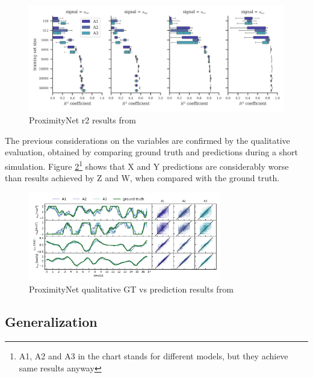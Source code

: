 \begin{figure}[!htb]
	\centering
	\includegraphics[width=1\textwidth]{"contents/images/03-proximitynet-r2"}
	\caption[ProximityNet \gls{r2} results from \cite{mantegazza2019visionbased}]{ProximityNet \gls{r2} results from \cite{mantegazza2019visionbased}}
	\label{fig:proximitynet-r2}
\end{figure}

\medskip

The previous considerations on the variables are confirmed by the qualitative evaluation, obtained by comparing ground truth and predictions during a short simulation. Figure \ref{fig:proximitynet-gt-pred}\footnote{A1, A2 and A3 in the chart stands for different models, but they achieve same results anyway} shows that X and Y predictions are considerably worse than results achieved by Z and W, when compared with the ground truth.

\begin{figure}[!htb]
	\centering
	\includegraphics[width=0.75\textwidth]{"contents/images/03-proximitynet-gt-pred"}
	\caption[ProximityNet qualitative GT vs prediction results from \cite{mantegazza2019visionbased}]{ProximityNet qualitative GT vs prediction results from \cite{mantegazza2019visionbased}}
	\label{fig:proximitynet-gt-pred}
\end{figure}



\subsection{Generalization}
\label{subsec:proximitynet-generalization}

